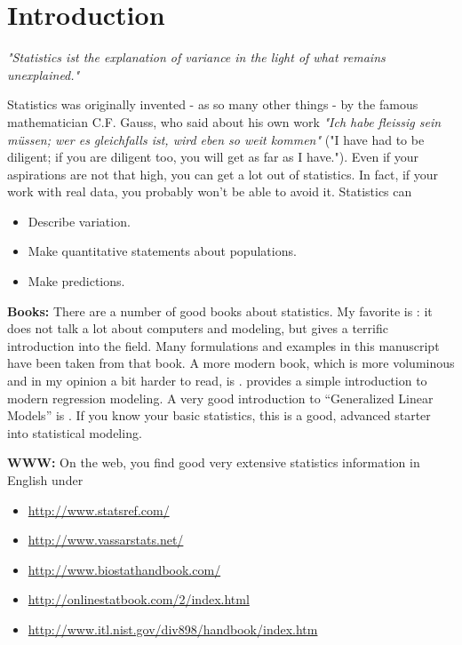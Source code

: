 \chapter{Introduction}

\emph{"Statistics ist the explanation of variance in the light of what remains
unexplained."}

\vspace{5 mm}

Statistics was originally invented - as so many other things - by the famous mathematician C.F. Gauss, who said about his own work \emph{"Ich habe fleissig sein m\"ussen; wer es gleichfalls ist, wird eben so weit kommen"} ("I have had to be diligent; if you are diligent too, you will get as far as I have."). Even if your aspirations are not that high, you can get a lot out of statistics. In fact, if your work with real data, you probably won't be able to avoid it. Statistics can

\begin{itemize}
  \item Describe variation.
  \item Make quantitative statements about populations.
  \item Make predictions.
\end{itemize}

\textbf{Books: }There are a number of good books about statistics. My favorite is \cite{altman99}: it does not talk a lot about computers and modeling, but gives a terrific introduction into the field. Many formulations and examples in this manuscript have been taken from that book. A more modern book, which is more voluminous and in my opinion a bit harder to read, is \cite{Riffenburgh2012}. \cite{Kaplan2009} provides a simple introduction to modern regression modeling. A very good introduction to “Generalized Linear Models” is \cite{Dobson2008}. If you know your basic statistics, this is a good, advanced starter into statistical modeling.

\vspace{5 mm}

\textbf{WWW: }On the web, you find good very extensive statistics information in English under
\begin{itemize}
    \item \url{http://www.statsref.com/}
    \item \url{http://www.vassarstats.net/}
    \item \url{http://www.biostathandbook.com/}
    \item \url{http://onlinestatbook.com/2/index.html}
    \item \url{http://www.itl.nist.gov/div898/handbook/index.htm}
\end{itemize}

